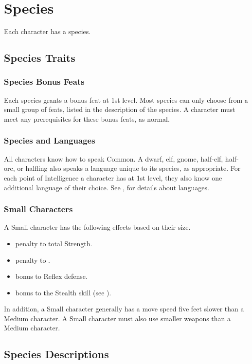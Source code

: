 \chapter{Species}\label{Species}

Each character has a species.

\section{Species Traits}

\subsection{Species Bonus Feats}
Each species grants a bonus feat at 1st level. Most species can only choose from a small group of feats, listed in the description of the species. A character must meet any prerequisites for these bonus feats, as normal.

\subsection{Species and Languages}
All characters know how to speak Common. A dwarf, elf, gnome, half-elf, half-orc, or halfling also speaks a language unique to its species, as appropriate. For each point of Intelligence a character has at 1st level, they also know one additional language of their choice. See , for details about languages.

\subsection{Small Characters}\label{Small Characters}
A Small character has the following effects based on their size.
\begin{itemize}
    \item {} penalty to total Strength.
    \item {} penalty to .
    \item {} bonus to Reflex defense.
    \item {} bonus to the Stealth skill (see ).
\end{itemize}

In addition, a Small character generally has a move speed five feet slower than a Medium character. A Small character must also use smaller weapons than a Medium character.

\section{Species Descriptions}

